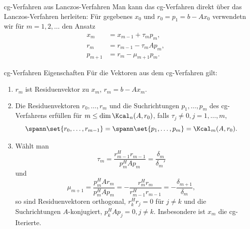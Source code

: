 \begin{karte}{cg-Verfahren aus Lanczos-Verfahren}
    Man kann das cg-Verfahren direkt über das Lanczos-Verfahren herleiten: 
    Für gegebenes \(x_0\) und \(r_0 = p_1 = b - Ax_0\) 
    verwendetn wir für \( m=1,2,\ldots \) den Ansatz 
    \begin{align*}
        x_m &= x_{m-1} + \tau_m p_m, \\
        r_m &= r_{m-1} - \tau_m A p_m, \\
        p_{m+1} &= r_m - \mu_{m+1} p_m.
    \end{align*}
\end{karte}

\begin{karte}{cg-Verfahren Eigenschaften}
    Für die Vektoren aus dem cg-Verfahren gilt: 
    \begin{enumerate}
        \item \(r_m\) ist Residuenvektor zu \(x_m\), \(r_m = b - A x_m\).
        \item Die Residuenvektoren \( r_0, \ldots, r_m \) und die Suchrichtungen 
        \(p_1, \ldots, p_m\) des cg-Verfahrens erfüllen 
        für \( m \leq \dim \Kcal_n(A, r_0) \), falls \(\tau_j \neq 0, j=1,\ldots, m\), 
        \[ \spann\set{ r_0,\ldots, r_{m-1} } = 
        \spann\set{p_1, \ldots, p_m} = \Kcal_m(A, r_0). \]
        \item Wählt man 
        \[ \tau_m = \frac{r_{m-1}^H r_{m-1}}{ p_m^H A p_m} = \frac{\delta_m}{\delta_m'} \]
        und 
        \[ \mu_{m+1} = \frac{p_m^H A r_m}{p_m^H A p_m} = - \frac{r_m^H r_m}{r_{m-1}^H r_{m-1}} = - \frac{\delta_{m+1}}{\delta_m}, \]
        so sind Residuenvektoren orthogonal, \( r_k^H r_j = 0 \) 
        für \(j\neq k\) und die Suchrichtungen \(A\)-konjugiert, 
        \(p_k^H A p_j = 0, j \neq k\). Insbesondere ist \(x_m\) die
        cg-Iterierte.
    \end{enumerate}
\end{karte}


